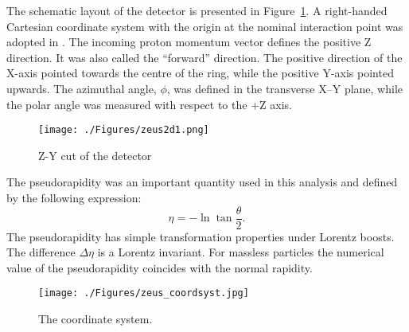 The schematic layout of the \zeus detector is presented in Figure~\ref{fig:zeus2d1}. A right-handed Cartesian coordinate system with the origin at the nominal interaction point was adopted in \zeus. The incoming proton momentum vector defines the positive Z direction. It was also called the ``forward'' direction. The positive direction of the X-axis pointed towards the centre of the \hera ring, while the positive Y-axis pointed upwards. The azimuthal angle, $\phi$, was defined in the transverse X--Y plane, while the polar angle was measured with respect to the +Z axis. 
\begin{landscape}
\begin{figure}[htpb]
	\centering
		\texttt{[image: ./Figures/zeus2d1.png]}
	\caption{Z-Y cut of the \zeus detector}
	\label{fig:zeus2d1}
\end{figure}
\end{landscape}

The pseudorapidity was an important quantity used in this analysis and defined by the following expression:
\begin{equation}
\eta = -\ln \tan \dfrac{\theta}{2}.
\end{equation}
The pseudorapidity has simple transformation properties under Lorentz boosts. The difference $\Delta \eta$ is a Lorentz invariant. For massless particles the numerical value of the pseudorapidity coincides with the normal rapidity.
\begin{figure}[htpb]
	\centering
		\texttt{[image: ./Figures/zeus\_coordsyst.jpg]}
	\caption{The \zeus coordinate system.}
	\label{fig:zeus_coordsyst}
\end{figure}
